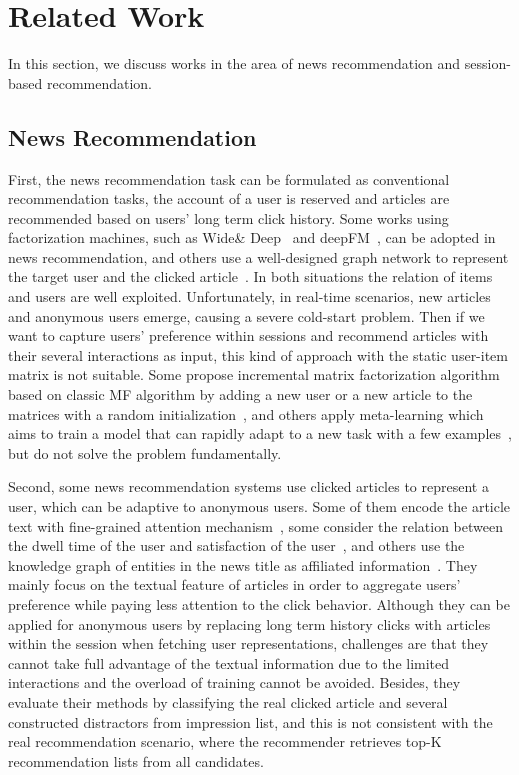 \section{Related Work}
In this section, we discuss works in the area of news recommendation and session-based
recommendation.

\subsection{News Recommendation}
First, the news recommendation task can be formulated as conventional recommendation tasks, the account of a user is reserved and articles are recommended based on users' long term click history. Some works using factorization machines, such as Wide\& Deep~\cite{cheng2016wide} and deepFM~\cite{guodeepfm2017}, can be adopted in news recommendation, and others use a well-designed graph network to represent the target user and the clicked article~\cite{hu2020graph,ge2020graph}. In both situations the relation of items and users are well exploited. Unfortunately, in real-time scenarios, new articles and anonymous users emerge, causing a severe cold-start problem. Then if we want to capture users' preference within sessions and recommend articles with their several interactions as input, this kind of approach with the static user-item matrix is not suitable. Some propose incremental matrix factorization algorithm based on classic MF algorithm by adding a new user or a new article to the matrices with a random initialization~\cite{al2018adaptive}, and others apply meta-learning which aims to train a model that can rapidly adapt to a new task with a few examples~\cite{lee_melu:_2019}, but do not solve the problem fundamentally.

Second, some news recommendation systems use clicked articles to represent a user, which can be adaptive to anonymous users. Some of them encode the article text with fine-grained attention mechanism~\cite{zhu2019dan,wu_neural_2019-1,wu2019npa,wang2020fine}, some consider the relation between the dwell time of the user and satisfaction of the user~\cite{wu2020CPRS}, and others use the knowledge graph of entities in the news title as affiliated information~\cite{wang2018dkn,wang_ripplenet:_2018}. They mainly focus on the textual feature of articles in order to aggregate users' preference while paying less attention to the click behavior. Although they can be applied for anonymous users by replacing long term history clicks with articles within the session when fetching user representations, challenges are that they cannot take full advantage of the textual information due to the limited interactions and the overload of training cannot be avoided. Besides, they evaluate their methods by classifying the real clicked article and several constructed distractors from impression list, and this is not consistent with the real recommendation scenario, where the recommender retrieves top-K recommendation lists from all candidates.

